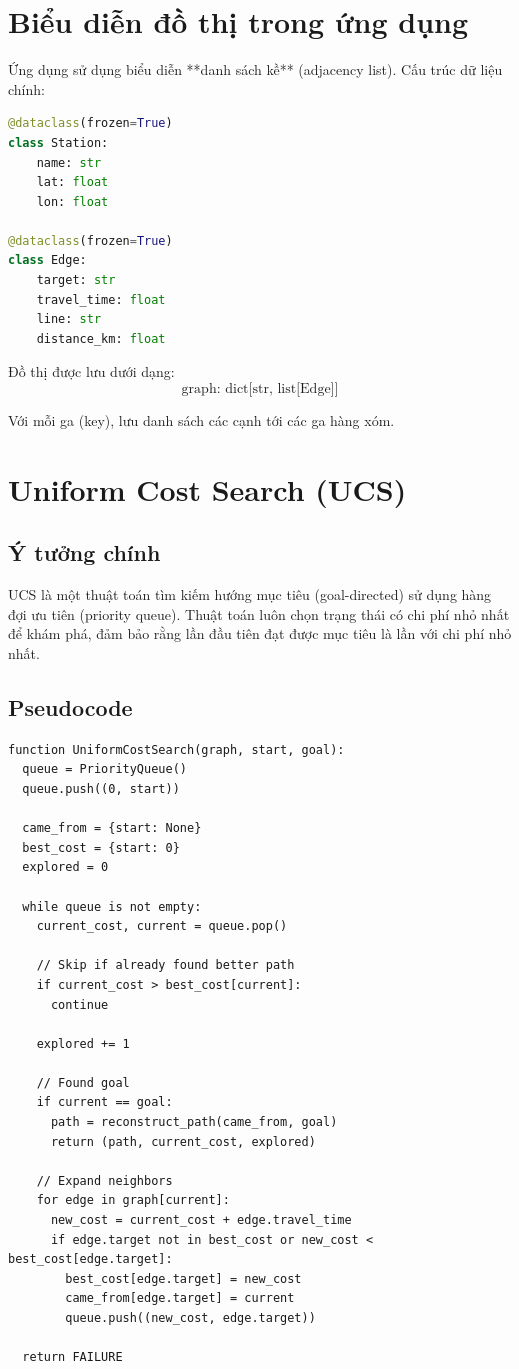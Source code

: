 \section{Biểu diễn đồ thị trong ứng dụng}

Ứng dụng sử dụng biểu diễn **danh sách kề** (adjacency list). Cấu trúc dữ liệu chính:

\begin{lstlisting}[language=Python, caption=Cấu trúc dữ liệu Station và Edge (metro\_app/data.py)]
@dataclass(frozen=True)
class Station:
    name: str
    lat: float
    lon: float

@dataclass(frozen=True)
class Edge:
    target: str
    travel_time: float
    line: str
    distance_km: float
\end{lstlisting}

Đồ thị được lưu dưới dạng:
\[
  \text{graph: dict[str, list[Edge]]}
\]

Với mỗi ga (key), lưu danh sách các cạnh tới các ga hàng xóm.

\section{Uniform Cost Search (UCS)}

\subsection{Ý tưởng chính}

UCS là một thuật toán tìm kiếm hướng mục tiêu (goal-directed) sử dụng hàng đợi ưu tiên (priority queue). Thuật toán luôn chọn trạng thái có chi phí nhỏ nhất để khám phá, đảm bảo rằng lần đầu tiên đạt được mục tiêu là lần với chi phí nhỏ nhất.

\subsection{Pseudocode}

\begin{lstlisting}[caption=Uniform Cost Search Pseudocode]
function UniformCostSearch(graph, start, goal):
  queue = PriorityQueue()
  queue.push((0, start))

  came_from = {start: None}
  best_cost = {start: 0}
  explored = 0

  while queue is not empty:
    current_cost, current = queue.pop()

    // Skip if already found better path
    if current_cost > best_cost[current]:
      continue

    explored += 1

    // Found goal
    if current == goal:
      path = reconstruct_path(came_from, goal)
      return (path, current_cost, explored)

    // Expand neighbors
    for edge in graph[current]:
      new_cost = current_cost + edge.travel_time
      if edge.target not in best_cost or new_cost < best_cost[edge.target]:
        best_cost[edge.target] = new_cost
        came_from[edge.target] = current
        queue.push((new_cost, edge.target))

  return FAILURE
\end{lstlisting}

